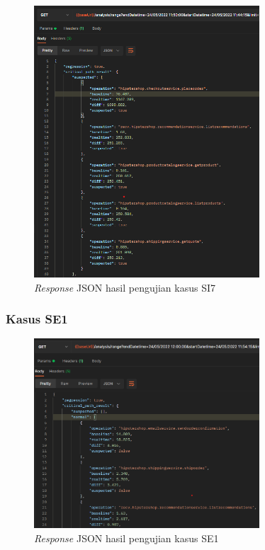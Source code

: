 \begin{figure}[!htb]
	\centering
	\includegraphics[width=0.75\textwidth]{resources/ch4/json/7.png}
	\caption{\textit{Response} JSON hasil pengujian kasus SI7}
	\label{result_json_7}
\end{figure}
%
\pagebreak

\subsubsection{Kasus SE1}
\begin{figure}[!htb]
	\centering
	\includegraphics[width=0.75\textwidth]{resources/ch4/json/8.png}
	\caption{\textit{Response} JSON hasil pengujian kasus SE1}
	\label{result_json_8}
\end{figure}

